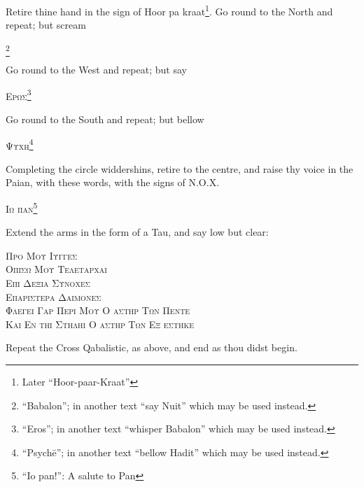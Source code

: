 Retire thine hand in the sign of Hoor pa kraat\footnote{Later \enquote{Hoor-paar-Kraat}}. Go round to the North and repeat; but scream \begin{quoting}[indentfirst=false]\textsc{\GreekBabalon}\footnote{\enquote{Babalon}; in another text \enquote{say Nuit} which may be used instead.} \end{quoting}

Go round to the West and repeat; but say \begin{quoting}[indentfirst=false]\textsc{Ερωσ}\footnote{\enquote{Eros}; in another text \enquote{whisper Babalon} which may be used instead.} \end{quoting}

Go round to the South and repeat; but bellow \begin{quoting}[indentfirst=false]\textsc{Ψυχη}\footnote{\enquote{Psych\=e}; in another text \enquote{bellow Hadit} which may be used instead.} \end{quoting}

Completing the circle widdershins, retire to the centre, and raise thy voice in the Paian, with these words, with the signs of N.O.X. \begin{quoting}[indentfirst=false]\textsc{Ιω παν}\footnote{\enquote{Io pan!}: A salute to Pan}\end{quoting}

Extend the arms in the form of a Tau, and say low but clear: 

\begin{quoting}[indentfirst=false]
\textsc{Προ Μου Ιυγγεσ} \\
\textsc{Οπισω Μου Τελεταρχαι} \\
\textsc{Επι Δεξια Συνοχεσ} \\
\textsc{Επαριστερα Δαιμονεσ} \\
\textsc{Φλεγει Γαρ Περι Μου Ο αστηρ Των Πεντε} \\
\textsc{Και Εν τηι Στηληι Ο αστηρ Των Εξ εστηκε}\footnotemark
\end{quoting}

Repeat the Cross Qabalistic, as above, and end as thou didst begin. 
